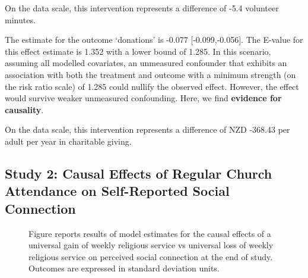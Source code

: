 \documentclass[
  singlecolumn]{article}
\begin{document}
On the data scale, this intervention represents a difference of -5.4
volunteer minutes.

The estimate for the outcome `donations' is -0.077 {[}-0.099,-0.056{]}.
The E-value for this effect estimate is 1.352 with a lower bound of
1.285. In this scenario, assuming all modelled covariates, an unmeasured
confounder that exhibits an association with both the treatment and
outcome with a minimum strength (on the risk ratio scale) of 1.285 could
nullify the observed effect. However, the effect would survive weaker
unmeasured confounding. Here, we find \textbf{evidence for causality}.

On the data scale, this intervention represents a difference of NZD
-368.43 per adult per year in charitable giving.

\newpage{}

\subsection{Study 2: Causal Effects of Regular Church Attendance on
Self-Reported Social
Connection}\label{study-2-causal-effects-of-regular-church-attendance-on-self-reported-social-connection}

\begin{figure}


\caption{\label{fig-2_1}Figure reports results of model estimates for
the causal effects of a universal gain of weekly religious service vs
universal loss of weekly religious service on perceived social
connection at the end of study. Outcomes are expressed in standard
deviation units.}

\end{figure}%
\end{document}
